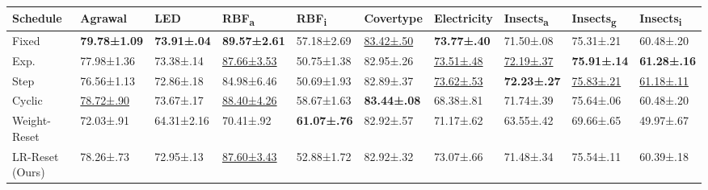 \begin{tabular}{llllllllll}
    \toprule
    Schedule        & Agrawal               & LED                 & RBF\textsubscript{a}   & RBF\textsubscript{i} & Covertype             & Electricity           & Insects\textsubscript{a} & Insects\textsubscript{g} & Insects\textsubscript{i} \\
    \midrule

    Fixed           & \bfseries 79.78±1.09  & \bfseries 73.91±.04 & \bfseries 89.57±2.61   & 57.18±2.69           & \underline{83.42±.50} & \bfseries 73.77±.40   & 71.50±.08                & 75.31±.21                & 60.48±.20                \\
    Exp.            & 77.98±1.36            & 73.38±.14           & \underline{87.66±3.53} & 50.75±1.38           & 82.95±.26             & \underline{73.51±.48} & \underline{72.19±.37}    & \bfseries 75.91±.14      & \bfseries 61.28±.16      \\
    Step            & 76.56±1.13            & 72.86±.18           & 84.98±6.46             & 50.69±1.93           & 82.89±.37             & \underline{73.62±.53} & \bfseries 72.23±.27      & \underline{75.83±.21}    & \underline{61.18±.11}    \\
    Cyclic          & \underline{78.72±.90} & 73.67±.17           & \underline{88.40±4.26} & 58.67±1.63           & \bfseries 83.44±.08   & 68.38±.81             & 71.74±.39                & 75.64±.06                & 60.48±.20                \\
    Weight-Reset    & 72.03±.91             & 64.31±2.16          & 70.41±.92              & \bfseries 61.07±.76  & 82.92±.57             & 71.17±.62             & 63.55±.42                & 69.66±.65                & 49.97±.67                \\
    LR-Reset (Ours) & 78.26±.73             & 72.95±.13           & \underline{87.60±3.43} & 52.88±1.72           & 82.92±.32             & 73.07±.66             & 71.48±.34                & 75.54±.11                & 60.39±.18                \\
    \bottomrule
\end{tabular}
